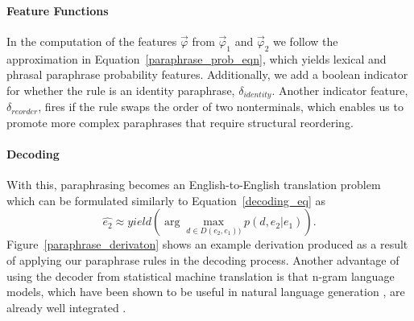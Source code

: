 \documentclass[11pt]{article}
\begin{document}
\paragraph{Feature Functions}

In the computation of the features $\vec{\varphi}$ from
$\vec{\varphi}_1$ and $\vec{\varphi}_2$ we follow the approximation in
Equation~\ref{paraphrase_prob_eqn}, which yields lexical and phrasal
paraphrase probability features. Additionally, we add a boolean
indicator for whether the rule is an identity paraphrase,
$\delta_{\mathit{identity}}$. Another indicator feature,
$\delta_{\mathit{reorder}}$, fires if the rule swaps the order of two
nonterminals, which enables us to promote more complex paraphrases
that require structural reordering.


\paragraph{Decoding}

With this, paraphrasing becomes an English-to-English translation
problem which can be formulated similarly to
Equation~\ref{decoding_eq} as 
\begin{equation*}
\hat{e_2} \approx yield(\arg \max_{d\in
  D(e_2,e_1))}{p(d,e_2|e_1)}).
  \end{equation*}
 Figure~\ref{paraphrase_derivaton}
shows an example derivation produced as a result of applying our
paraphrase rules in the decoding process. Another advantage of using
the decoder from statistical machine translation is that n-gram
language models, which have been shown to be useful in natural
language generation \cite{Langkilde1998}, are already well integrated
\cite{Huang2007}.
\end{document}

